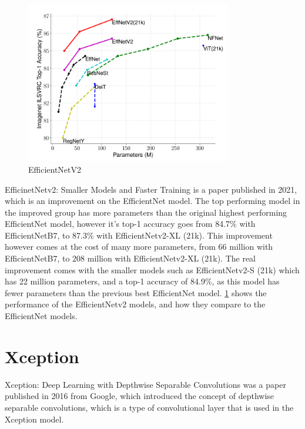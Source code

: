 \documentclass[]{final_report}
\begin{document}
\begin{figure}
  \centering
  \includegraphics[width=0.8\textwidth]{images/EfficientNetv2-Performance-Graph.png}
  \caption{EfficientNetV2 \cite{DBLP:journals/corr/abs-2104-00298}}
  \label{fig:efficientnetv2-performance-graph}
\end{figure}

EfficinetNetv2: Smaller Models and Faster Training\cite{DBLP:journals/corr/abs-2104-00298} is a paper published in 2021, which is an improvement on the EfficientNet model. The top performing model in the improved group has more parameters than the original highest performing EfficientNet model, however it's top-1 accuracy goes from 84.7\% with EfficientNetB7, to 87.3\% with EfficientNetv2-XL (21k). This improvement however comes at the cost of many more parameters, from 66 million with EfficientNetB7, to 208 million with EfficientNetv2-XL (21k). The real improvement comes with the smaller models such as EfficientNetv2-S (21k) which has 22 million parameters, and a top-1 accuracy of 84.9\%, as this model has fewer parameters than the previous best EfficientNet model. \ref{fig:efficientnetv2-performance-graph} shows the performance of the EfficientNetv2 models, and how they compare to the EfficientNet models.

\section{Xception}

Xception: Deep Learning with Depthwise Separable Convolutions\cite{DBLP:journals/corr/Chollet16a} was a paper published in 2016 from Google, which introduced the concept of depthwise separable convolutions, which is a type of convolutional layer that is used in the Xception model.
\end{document}
